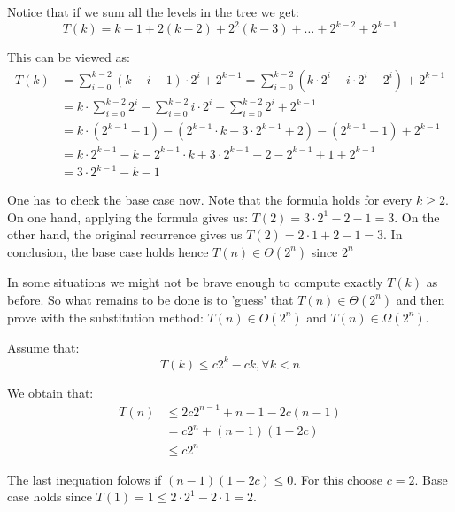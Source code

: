 \documentclass{article}
\renewcommand{\leq}{\leqslant}
\renewcommand{\geq}{\geqslant}
\begin{document}
Notice that if we sum all the levels in the tree we get:
\begin{equation}
	T(k)= k-1 + 2(k-2) + 2^2(k-3) + \dots + 2^{k-2} + 2^{k-1}
\end{equation}

This can be viewed as:
\begin{equation*}
\label{eq-expo2}
\begin{split}
T(k)&= \sum_{i=0}^{k-2}(k - i - 1) \cdot 2^{i} + 2^{k-1} = \sum_{i=0}^{k-2}(k \cdot 2^{i} - i \cdot 2^{i} - 2^{i}) + 2^{k-1} \\
	&= k \cdot \sum_{i=0}^{k-2} 2^{i} - \sum_{i=0}^{k-2} i \cdot 2^{i} - \sum_{i=0}^{k-2}2^i + 2^{k-1} \\
	&=  k \cdot (2^{k-1} - 1) - (2^{k-1}\cdot k - 3\cdot 2^{k-1}+2) - (2^{k-1} - 1) + 2^{k-1} \\
	&= k \cdot 2^{k-1} - k - 2^{k-1}\cdot k + 3\cdot 2^{k-1}-2 -2^{k-1} + 1 + 2^{k-1}\\
	&= 3 \cdot 2^{k-1} - k - 1
\end{split}
\end{equation*}

One has to check the base case now. Note that the formula holds for every $k \geq 2$. On one hand, applying the formula gives us:
$T(2) = 3 \cdot 2^{1} - 2 - 1 = 3$.
On the other hand, the original recurrence gives us $T(2) = 2 \cdot 1 + 2 - 1 = 3$. In conclusion, the base case holds hence $T(n) \in \Theta(2^n)$ since $2^{n}$


In some situations we might not be brave enough to compute exactly $T(k)$ as before. So what remains to be done is to 'guess' that $T(n) \in \Theta(2^n)$ and then prove with the substitution method: $T(n) \in O(2^n)$ and $T(n) \in \Omega(2^n)$.

Assume that:
\begin{equation*}
\label{eq-expo}
T(k) \leq c2^k - ck, \forall k < n
\end{equation*}

We obtain that:
\begin{equation*}
\label{eq-expo2}
\begin{split}
T(n) & \leq 2c2^{n-1}+n-1 - 2c(n-1) \\
	&= c2^{n} + (n-1)(1 - 2c) \\
	& \leq c2^{n}
\end{split}
\end{equation*}

The last inequation folows if $(n-1)(1-2c) \leq 0$. For this choose $c=2$. Base case holds since $T(1) = 1 \leq 2 \cdot 2^{1} - 2\cdot 1=2$.
\end{document}

